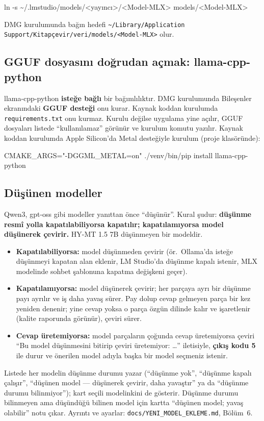 \documentclass[11pt,a4paper]{article}
\newcommand{\dosya}[1]{\texttt{#1}}
\begin{document}
\begin{komut}
ln -s \textasciitilde/.lmstudio/models/<yayıncı>/<Model-MLX> models/<Model-MLX>
\end{komut}

DMG kurulumunda bağın hedefi
\dosya{\textasciitilde/Library/\allowbreak Application Support/\allowbreak Kitapçevir/\allowbreak veri/\allowbreak models/<Model-MLX>}
olur.

\subsection{GGUF dosyasını doğrudan açmak: llama-cpp-python}
llama-cpp-python \textbf{isteğe bağlı} bir bağımlılıktır. DMG kurulumunda
Bileşenler ekranındaki \textbf{GGUF desteği} onu kurar. Kaynak koddan
kurulumda \dosya{requirements.txt} onu kurmaz. Kurulu değilse uygulama yine
açılır, GGUF dosyaları listede ``kullanılamaz'' görünür ve kurulum komutu
yazılır. Kaynak koddan kurulumda Apple Silicon'da Metal desteğiyle kurulum
(proje klasöründe):

\begin{komut}
CMAKE\_ARGS="-DGGML\_METAL=on" ./venv/bin/pip install llama-cpp-python
\end{komut}

\subsection{Düşünen modeller}
Qwen3, gpt-oss gibi modeller yanıttan önce ``düşünür''. Kural şudur:
\textbf{düşünme resmî yolla kapatılabiliyorsa kapatılır; kapatılamıyorsa model
düşünerek çevirir.} HY-MT 1.5 7B düşünmeyen bir modeldir.
\begin{itemize}
  \item \textbf{Kapatılabiliyorsa:} model düşünmeden çevirir (ör.\ Ollama'da
        isteğe düşünmeyi kapatan alan eklenir, LM Studio'da düşünme kapalı
        istenir, MLX modelinde sohbet şablonuna kapatma değişkeni geçer).
  \item \textbf{Kapatılamıyorsa:} model düşünerek çevirir; her parçaya ayrı
        bir düşünme payı ayrılır ve iş daha yavaş sürer. Pay dolup cevap
        gelmeyen parça bir kez yeniden denenir; yine cevap yoksa o parça
        özgün dilinde kalır ve işaretlenir (kalite raporunda görünür), çeviri
        sürer.
  \item \textbf{Cevap üretemiyorsa:} model parçaların çoğunda cevap
        üretemiyorsa çeviri ``Bu model düşünmesini bitirip çeviri
        üretemiyor: \ldots'' iletisiyle, \textbf{çıkış kodu 5} ile durur ve
        önerilen model adıyla başka bir model seçmeniz istenir.
\end{itemize}
Listede her modelin düşünme durumu yazar (``düşünme yok'', ``düşünme kapalı
çalışır'', ``düşünen model --- düşünerek çevirir, daha yavaştır'' ya da
``düşünme durumu bilinmiyor''); kart seçili modelinkini de gösterir. Düşünme
durumu bilinmeyen ama düşündüğü bilinen model için kartta ``düşünen model;
yavaş olabilir'' notu çıkar.
Ayrıntı ve ayarlar: \dosya{docs/\allowbreak YENI\_MODEL\_EKLEME.md}, Bölüm~6.
\end{document}
